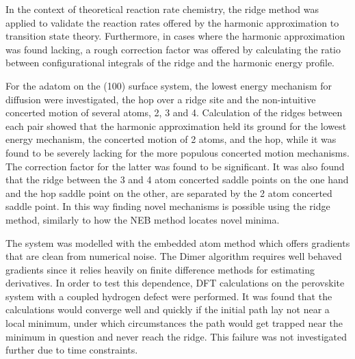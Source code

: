 In the context of theoretical reaction rate chemistry, the ridge method was applied to validate the reaction rates offered by the harmonic approximation to transition state theory.
Furthermore, in cases where the harmonic approximation was found lacking, a rough correction factor was offered by calculating the ratio between configurational integrals of the ridge and the harmonic energy profile.

For the  adatom on the (100) surface system, the lowest energy mechanism for diffusion were investigated, the hop over a ridge site and the non-intuitive concerted motion of several atoms, 2, 3 and 4.
Calculation of the ridges between each pair showed that the harmonic approximation held its ground for the lowest energy mechanism, the concerted motion of 2 atoms, and the hop, while it was found to be severely lacking for the more populous concerted motion mechanisms.
The correction factor for the latter was found to be significant.
It was also found that the ridge between the 3 and 4 atom concerted saddle points on the one hand and the hop saddle point on the other, are separated by the 2 atom concerted saddle point.
In this way finding novel mechanisms is possible using the ridge method, similarly to how the NEB method locates novel minima.

The  system was modelled with the embedded atom method which offers gradients that are clean from numerical noise.
The Dimer algorithm requires well behaved gradients since it relies heavily on finite difference methods for estimating derivatives.
In order to test this dependence, DFT calculations on the  perovskite system with a coupled hydrogen defect were performed.
\expand {}
It was found that the calculations would converge well and quickly if the initial path lay not near a local minimum, under which circumstances the path would get trapped near the minimum in question and never reach the ridge.
This failure was not investigated further due to time constraints.


